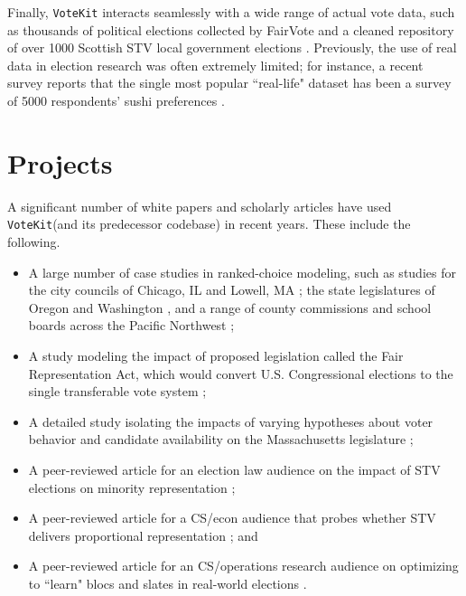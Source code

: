 \documentclass{article}
\newcommand{\VK}{{\tt VoteKit}\xspace}
\begin{document}
Finally, \VK interacts seamlessly with a wide range of actual vote data, such as thousands of political elections collected by FairVote and a cleaned repository of over 1000 Scottish STV local government elections \cite{RCV-Cruncher,Scot-Elex}.  Previously, the use of real data in election research was often extremely limited; for instance, a recent survey reports that the single most popular ``real-life" dataset has been a survey of 5000 respondents' sushi preferences \cite{GuideExperiments}.


\clearpage
\section{Projects}
A significant number of white papers and scholarly articles have used \VK (and its predecessor codebase) in recent years.
These include the following.
\begin{itemize}
    \item A large number of case studies in ranked-choice modeling, such as studies for the city councils of Chicago, IL \cite{chicago_city} and  Lowell, MA \cite{lowell_city}; the state legislatures of Oregon and Washington \cite{oregon_state,washington_leg}, and a range of county commissions and school boards across the Pacific Northwest \cite{tukwila_school,chelan_county};
    \item A study modeling the impact of proposed legislation called the Fair Representation Act, which would convert U.S. Congressional elections to the single transferable vote system \cite{FairVote};
    \item A detailed study isolating the impacts of varying hypotheses about voter behavior and candidate availability on the Massachusetts legislature \cite{massachusetts_leg};
    \item A peer-reviewed article for an election law audience on the impact of STV elections on minority representation \cite{Benade2021};
    \item A peer-reviewed article for a CS/econ audience that probes whether STV delivers proportional representation \cite{benade_donnay_duchin_weighill_24}; and
    \item A peer-reviewed article for an CS/operations research audience on optimizing to ``learn" blocs and slates in real-world elections \cite{duchin_tapp_24}.
\end{itemize}

\FloatBarrier
\end{document}
